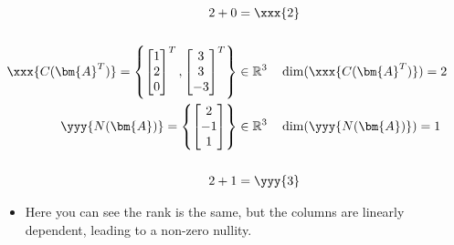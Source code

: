 \begin{itemize}
\begin{itemize}
\begin{align*}
      \\
      \hspace{83pt} 2 + 0 &= \xxx{2} \\
      \\
      \xxx{C(\bm{A}^T)} = \left\{ 
        \begin{bmatrix} 1 \\ 2 \\ 0 \end{bmatrix}^T,
        \begin{bmatrix} 3 \\ 3 \\ -3 \end{bmatrix}^T
      \right\}
      &\in \mathbb{R}^3 \quad \dim(\xxx{C(\bm{A}^T)}) = 2 \\
      \yyy{N(\bm{A})} = \left\{\begin{bmatrix} 2 \\ -1 \\ 1 \end{bmatrix}\right\} 
      &\in \mathbb{R}^3 \quad \dim(\yyy{N(\bm{A})}) = 1 \\
      \\
      2 + 1 &= \yyy{3}
    \end{align*}
    \begin{itemize}
      \item Here you can see the rank is the same, but the columns are linearly dependent, leading to a non-zero nullity. 
    \end{itemize}
  \end{itemize}
\end{itemize}
